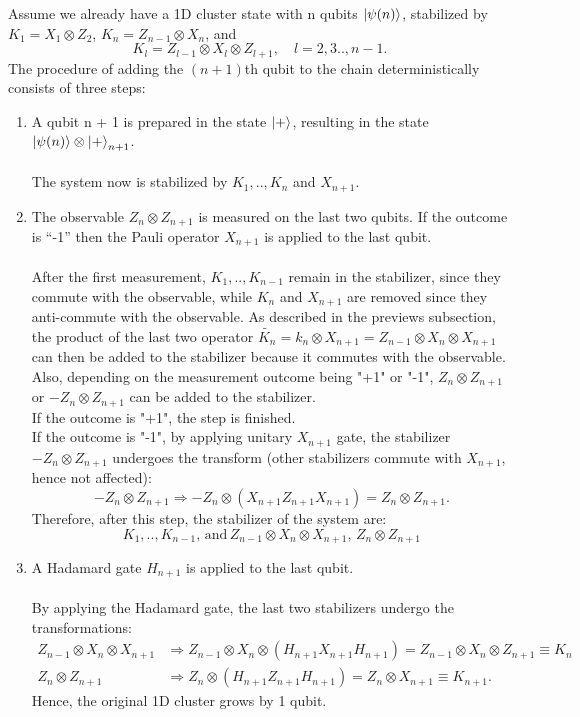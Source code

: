 \documentclass[letterpaper,10pt]{article}
\begin{document}
Assume we already have a 1D cluster state with n qubits $\Ket{\psi(n)}$, stabilized by $K_1 = X_1\otimes Z_2$, $K_n = Z_{n-1} \otimes X_n$, and
\begin{equation}
	K_l=Z_{l-1}\otimes X_l\otimes Z_{l+1}, \quad l=2,3..,n-1.
\end{equation}
The procedure of adding the $(n+1)$th qubit to the chain deterministically consists of three steps:
\begin{enumerate}
	\item
	A qubit n + 1 is prepared in the state $\Ket{+}$, resulting in the state $\Ket{\psi(n)}\otimes\Ket{+}_{n+1}$. \\ \\
	The system now is stabilized by $K_1,..,K_n$ and $X_{n+1}$.
	
	\item
	The observable $Z_n\otimes Z_{n+1}$ is measured on the last two qubits. If the outcome is “-1” then the Pauli operator $X_{n+1}$ is applied to the last qubit. \\ \\
	After the first measurement, $K_1,..,K_{n-1}$ remain in the stabilizer, since they commute with the observable, while $K_n$ and $X_{n+1}$ are removed since they anti-commute with the observable. As described in the previews subsection, the product of the last two operator $\tilde{K_n}=k_n\otimes X_{n+1}=Z_{n-1} \otimes X_n\otimes X_{n+1}$ can then be added to the stabilizer because it commutes with the observable. Also, depending on the measurement outcome being "+1" or "-1", $Z_n\otimes Z_{n+1}$ or $-Z_n\otimes Z_{n+1}$ can be added to the stabilizer.\\
	If the outcome is "+1", the step is finished.\\
	If the outcome is "-1", by applying unitary $X_{n+1}$ gate, the stabilizer $-Z_n\otimes Z_{n+1}$ undergoes the transform (other stabilizers commute with $X_{n+1}$, hence not affected):
	\begin{equation}
		-Z_n\otimes Z_{n+1}\Rightarrow -Z_n\otimes (X_{n+1}Z_{n+1}X_{n+1})=Z_n\otimes Z_{n+1}.
	\end{equation}
	Therefore, after this step, the stabilizer of the system are:
	\begin{equation}
		K_1,..,K_{n-1},\, \textrm{and} \, Z_{n-1} \otimes X_n\otimes X_{n+1}, \, Z_n\otimes Z_{n+1}
	\end{equation}
	
	\item
	A Hadamard gate $H_{n+1}$ is applied to the last qubit.\\ \\
	By applying the Hadamard gate, the last two stabilizers undergo the transformations:
	\begin{align}
		Z_{n-1} \otimes X_n\otimes X_{n+1} &\Rightarrow Z_{n-1} \otimes X_n\otimes(H_{n+1}X_{n+1}H_{n+1}) = Z_{n-1} \otimes X_n\otimes Z_{n+1}\equiv K_n\\
		Z_n\otimes Z_{n+1} &\Rightarrow Z_{n}\otimes(H_{n+1}Z_{n+1}H_{n+1}) = Z_{n}\otimes X_{n+1}\equiv K_{n+1}.
	\end{align}	
	Hence, the original 1D cluster grows by 1 qubit.	
\end{enumerate} 
\end{document}
